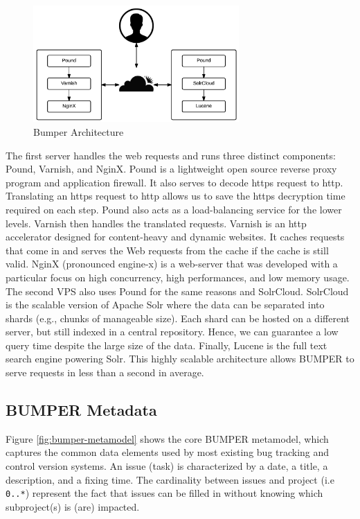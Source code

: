 \documentclass[12pt]{report}
\begin{document}
\begin{figure}
  \centering
  \includegraphics[width=0.7\textwidth]{media/archi.png}
  \caption{Bumper Architecture\label{fig:bumper-architecture}}
\end{figure}

The first server handles the web requests and runs three distinct
components: Pound, Varnish, and NginX. Pound is a lightweight open
source reverse proxy program and application firewall. It also serves to
decode https request to http. Translating an https request to http
allows us to save the https decryption time required on each step. Pound
also acts as a load-balancing service for the lower levels. Varnish then
handles the translated requests. Varnish is an http accelerator designed
for content-heavy and dynamic websites. It caches requests that come in
and serves the Web requests from the cache if the cache is still valid.
NginX (pronounced engine-x) is a web-server that was developed with a
particular focus on high concurrency, high performances, and low memory
usage. The second VPS also uses Pound for the same reasons and
SolrCloud. SolrCloud is the scalable version of Apache Solr where the
data can be separated into shards (e.g., chunks of manageable size).
Each shard can be hosted on a different server, but still indexed in a
central repository. Hence, we can guarantee a low query time despite the
large size of the data. Finally, Lucene is the full text search engine
powering Solr. This highly scalable architecture allows BUMPER to serve
requests in less than a second in average.

\subsection{\texorpdfstring{BUMPER
Metadata\label{sub:BUMPER Metadata}}{BUMPER Metadata}}\label{bumper-metadata}

Figure \ref{fig:bumper-metamodel} shows the core BUMPER metamodel, which
captures the common data elements used by most existing bug tracking and
control version systems. An issue (task) is characterized by a date, a
title, a description, and a fixing time. The cardinality between issues
and project (i.e \lstinline!0..*!) represent the fact that issues can be
filled in without knowing which subproject(s) is (are) impacted.
\end{document}
